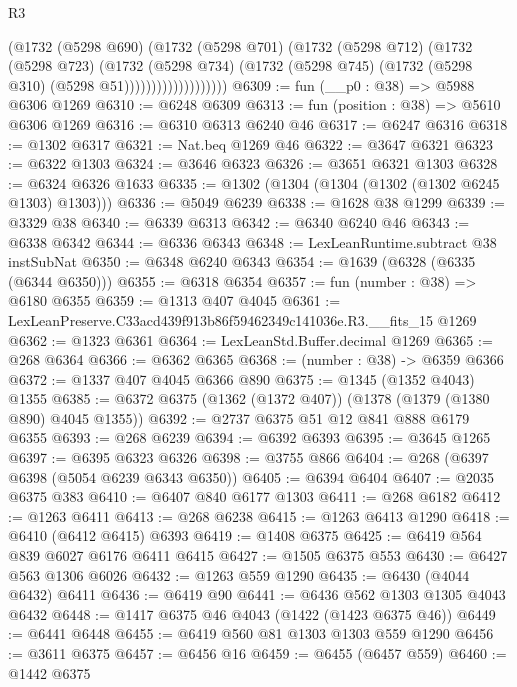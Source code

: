 \begin{lexlean}{R3}
\begin{coremodule}
                          (@1732
                            (@5298 @690)
                            (@1732
                              (@5298 @701)
                              (@1732
                                (@5298 @712)
                                (@1732
                                  (@5298 @723)
                                  (@1732
                                    (@5298 @734)
                                    (@1732
                                      (@5298 @745)
                                      (@1732 (@5298 @310) (@5298 @51)))))))))))))))))))
@6309 := fun (__p0 : @38) => @5988 @6306 @1269
@6310 := @6248 @6309
@6313 := fun (position : @38) => @5610 @6306 @1269
@6316 := @6310 @6313 @6240 @46
@6317 := @6247 @6316
@6318 := @1302 @6317
@6321 := Nat.beq @1269 @46
@6322 := @3647 @6321
@6323 := @6322 @1303
@6324 := @3646 @6323
@6326 := @3651 @6321 @1303
@6328 := @6324 @6326 @1633
@6335 := @1302 (@1304 (@1304 (@1302 (@1302 @6245 @1303) @1303)))
@6336 := @5049 @6239
@6338 := @1628 @38 @1299
@6339 := @3329 @38
@6340 := @6339 @6313
@6342 := @6340 @6240 @46
@6343 := @6338 @6342
@6344 := @6336 @6343
@6348 := LexLeanRuntime.subtract @38 instSubNat
@6350 := @6348 @6240 @6343
@6354 := @1639 (@6328 (@6335 (@6344 @6350)))
@6355 := @6318 @6354
@6357 := fun (number : @38) => @6180 @6355
@6359 := @1313 @407 @4045
@6361 := LexLeanPreserve.C33acd439f913b86f59462349c141036e.R3.__fits_15 @1269
@6362 := @1323 @6361
@6364 := LexLeanStd.Buffer.decimal @1269
@6365 := @268 @6364
@6366 := @6362 @6365
@6368 := (number : @38) -> @6359 @6366
@6372 := @1337 @407 @4045 @6366 @890
@6375 := @1345 (@1352 @4043) @1355
@6385 := @6372 @6375 (@1362 (@1372 @407)) (@1378 (@1379 (@1380 @890) @4045 @1355))
@6392 := @2737 @6375 @51 @12 @841 @888 @6179 @6355
@6393 := @268 @6239
@6394 := @6392 @6393
@6395 := @3645 @1265
@6397 := @6395 @6323 @6326
@6398 := @3755 @866
@6404 := @268 (@6397 @6398 (@5054 @6239 @6343 @6350))
@6405 := @6394 @6404
@6407 := @2035 @6375 @383
@6410 := @6407 @840 @6177 @1303
@6411 := @268 @6182
@6412 := @1263 @6411
@6413 := @268 @6238
@6415 := @1263 @6413 @1290
@6418 := @6410 (@6412 @6415) @6393
@6419 := @1408 @6375
@6425 := @6419 @564 @839 @6027 @6176 @6411 @6415
@6427 := @1505 @6375 @553
@6430 := @6427 @563 @1306 @6026
@6432 := @1263 @559 @1290
@6435 := @6430 (@4044 @6432) @6411
@6436 := @6419 @90
@6441 := @6436 @562 @1303 @1305 @4043 @6432
@6448 := @1417 @6375 @46 @4043 (@1422 (@1423 @6375 @46))
@6449 := @6441 @6448
@6455 := @6419 @560 @81 @1303 @1303 @559 @1290
@6456 := @3611 @6375
@6457 := @6456 @16
@6459 := @6455 (@6457 @559)
@6460 := @1442 @6375

\end{coremodule}
\end{lexlean}
